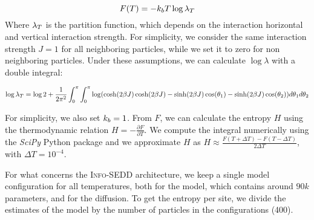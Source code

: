 \begin{equation}\label{eq:free_energy}
    F(T) = -k_b T\log\lambda_T
\end{equation}
Where $\lambda_T$ is the partition function, which depends on the interaction horizontal and vertical interaction strength. For simplicity, we consider the same interaction strength $J=1$ for all neighboring particles, while we set it to zero for non neighboring particles. Under these assumptions, we can calculate $\log\lambda$ with a double integral\citep{onsager1944crystal}:

{\footnotesize\begin{equation}
    \log\lambda_T = \log 2 + \frac{1}{2\pi^2}\int_0^\pi\int_0^\pi\log(\cosh(2\beta J)\cosh(2\beta J)-\sinh(2\beta J)\cos(\theta_1)-\sinh(2\beta J)\cos(\theta_2))d\theta_1d\theta_2
\end{equation}}

For simplicity, we also set $k_b=1$. From $F$, we can calculate the entropy $H$ using the thermodynamic relation $H=-\frac{\partial F}{\partial T}$. We compute the integral numerically using the \textit{SciPy} Python package \citep{2020SciPy-NMeth} and we approximate $H$ as $H\approx \frac{F(T+\Delta T)-F(T-\Delta T)}{2\Delta T}$, with $\Delta T = 10^{-4}$.

For what concerns the \textsc{Info-SEDD} architecture, we keep a single model configuration for all temperatures, both for the model, which contains around $90k$ parameters, and for the diffusion. To get the entropy per site, we divide the estimates of the model by the number of particles in the configurations (400).